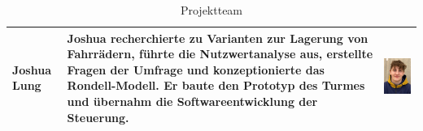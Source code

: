 \begin{table}[H]
\begin{center}
\begin{tabular}{|p{}|p{}|p{}|}
      Joshua Lung    & Joshua recherchierte zu Varianten zur Lagerung von Fahrrädern, führte die Nutzwertanalyse aus, erstellte Fragen der Umfrage und konzeptionierte das Rondell-Modell. Er baute den Prototyp des Turmes und übernahm die Softwareentwicklung der Steuerung. & \begin{minipage}{.3\textwidth}\includegraphics{images/joshualung.jpg} \end{minipage}    \\
      \hline
    \end{tabular}
    \caption{Projektteam}
    \label{tab:projektteam}
  \end{center}
\end{table}

